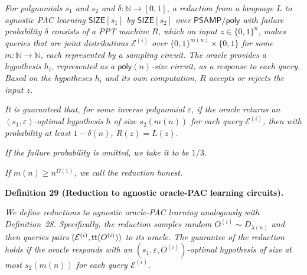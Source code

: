 \documentclass[10pt,a4paper]{article}
\begin{document}
\emph{For polynomials $s_{1}$ and $s_{2}$ and $\delta:\mathbb{N}\to[0,1]$, a reduction from a language $L$ to agnostic PAC learning ${\mathsf{SIZE}}[s_{1}]$ by ${\mathsf{SIZE}}[s_{2}]$ over ${\mathsf{P}}{\mathsf{SAMP}}/{\mathsf{poly}}$ with failure probability $\delta$ consists of a PPT machine $R$, which on input $z\in\{0,1\}^{n}$, makes queries that are joint distributions $\mathcal{E}^{(i)}$ over $\{0,1\}^{m(n)}\times\{0,1\}$ for some $m:\mathbb{N}\to\mathbb{N}$, each represented by a sampling circuit. The oracle provides a hypothesis $h_{i}$, represented as a ${\mathsf{poly}}(n)$-size circuit, as a response to each query. Based on the hypotheses $h_{i}$ and its own computation, $R$ accepts or rejects the input $z$.}\par




\emph{It is guaranteed that, for some inverse polynomial $\varepsilon$, if the oracle returns an $(s_{1},\varepsilon)$-optimal hypothesis $h$ of size $s_{2}(m(n))$ for each query $\mathcal{E}^{(i)}$, then with probability at least $1-\delta(n)$, $R(z)=L(z)$.}\par




\emph{If the failure probability is omitted, we take it to be $1/3$.}\par




\emph{If $m(n)\geq n^{\Omega(1)}$, we call the reduction honest.}\par







\par\medskip\noindent\textbf{
\textbf{Definition 29}\textbf{ }(Reduction to agnostic oracle-PAC learning circuits)\textbf{.}
}\par



\emph{We define reductions to agnostic oracle-PAC learning analogously with Definition 28. Specifically, the reduction samples random $O^{(i)}\sim D_{\lambda(n)}$ and then queries pairs $(\mathcal{E}^{(i)},{\sf tt}(O^{(i)}))$ to its oracle. The guarantee of the reduction holds if the oracle responds with an $(s_{1},\varepsilon,O^{(i)})$-optimal hypothesis of size at most $s_{2}(m(n))$ for each query $\mathcal{E}^{(i)}$.}\par
\end{document}
